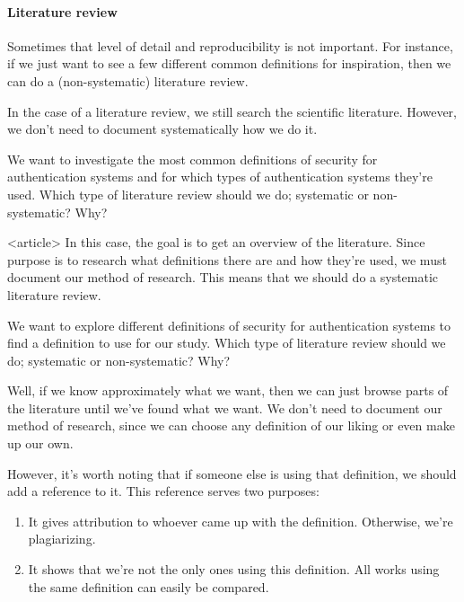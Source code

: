 \paragraph{Literature review}

Sometimes that level of detail and reproducibility is not important.
For instance, if we just want to see a few different common definitions for 
inspiration, then we can do a (non-systematic) literature review.

In the case of a literature review, we still search the scientific literature.
However, we don't need to document systematically how we do it.

\begin{frame}
  \begin{exercise}
    We want to investigate \alert<2>{the most common} definitions of security 
    for authentication systems and for which types of authentication systems 
    they're used.
    Which type of literature review should we do; systematic or non-systematic?
    Why?
  \end{exercise}

  \begin{onlyenv}<article>
In this case, the goal is to get an overview of the literature.
Since purpose is to research what definitions there are and how they're used, 
we must document our method of research.
This means that we should do a systematic literature review.
  \end{onlyenv}

  \begin{exercise}
    We want to \alert<2>{explore different} 
    definitions of security for authentication systems to find a definition to 
    use for our study.
    Which type of literature review should we do; systematic or non-systematic?
    Why?
  \end{exercise}
\end{frame}

Well, if we know approximately what we want, then we can just browse parts of 
the literature until we've found what we want.
We don't need to document our method of research, since we can choose any 
definition of our liking or even make up our own.

However, it's worth noting that if someone else is using that definition, we 
should add a reference to it.
This reference serves two purposes:
\begin{enumerate}
  \item It gives attribution to whoever came up with the definition.
    Otherwise, we're plagiarizing.
  \item It shows that we're not the only ones using this definition.
    All works using the same definition can easily be compared.
\end{enumerate}

